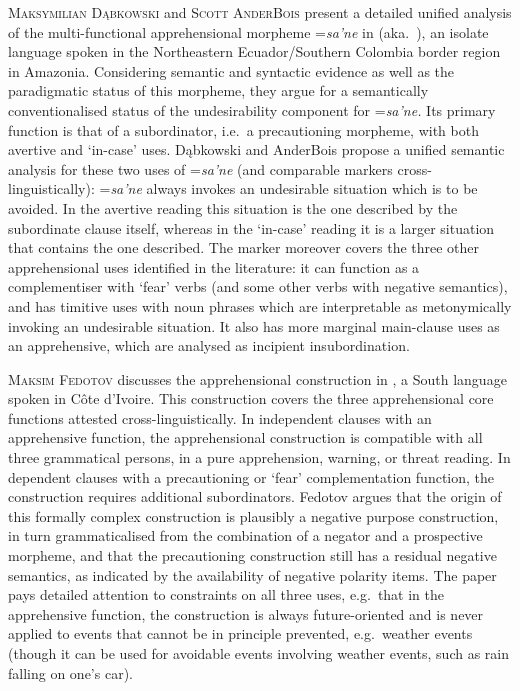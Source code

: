 \documentclass[output=paper,colorlinks,citecolor=brown]{langscibook}
\begin{document}
\textsc{Maksymilian} \textsc{Dąbkowski}  and \textsc{Scott} \textsc{AnderBois} present a detailed unified analysis of the multi-functional apprehensional morpheme =\textit{sa'ne} in \textsc{} (aka.\ ), an isolate language spoken in the Northeastern Ecuador/Southern Colombia border region in Amazonia. Considering semantic and syntactic evidence as well as the paradigmatic status of this morpheme, they argue for a semantically conventionalised status of the undesirability component for =\textit{sa'ne.} Its primary function is that of a subordinator, i.e.\ a precautioning morpheme, with both avertive and `in-case' uses.  Dąbkowski and AnderBois propose a unified semantic analysis for these two uses of =\textit{sa'ne} (and comparable markers cross-linguistically): =\textit{sa'ne} always invokes an undesirable situation which is to be avoided. In the avertive reading this situation is the one described by the subordinate clause itself, whereas in the `in-case' reading it is a larger situation that contains the one described. The  marker moreover covers the three other apprehensional uses identified in the literature: it can function as a complementiser with `fear' verbs (and some other verbs with negative semantics), and has timitive uses with noun phrases which are interpretable as metonymically invoking an undesirable situation. It also has more marginal main-clause uses as an apprehensive, which are analysed as incipient insubordination.



\textsc{Maksim} \textsc{Fedotov} discusses the apprehensional construction in \textsc{}, a South  language spoken in Côte d'Ivoire. This construction covers the three apprehensional core functions attested cross-linguistically. In independent clauses with an apprehensive function, the apprehensional construction is compatible with all three grammatical persons, in a pure apprehension, warning, or threat reading. In dependent clauses with a precautioning or `fear' complementation function, the construction requires additional subordinators. Fedotov argues that the origin of this formally complex construction is plausibly a negative purpose construction, in turn grammaticalised from the combination of a negator and a prospective morpheme, and that the precautioning construction still has  a residual negative semantics, as indicated by the availability of negative polarity items. The paper pays detailed attention to constraints on all three uses, e.g.\ that in the apprehensive function, the construction is always future-oriented and is never applied to events that cannot be in principle prevented, e.g.\ weather events (though it can be used for avoidable events involving weather events, such as rain falling on one's car).
\end{document}
